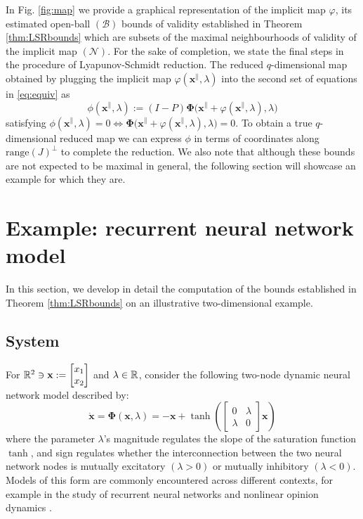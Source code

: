 \documentclass[letterpaper, 10 pt, conference, dvipsnames]{ieeeconf}
\begin{document}
In Fig. \ref{fig:map} we provide a graphical representation of the implicit map \(\varphi\), {its estimated open-ball \((\mathcal{B})\) bounds of validity established in Theorem \ref{thm:LSRbounds} which are subsets of the maximal neighbourhoods of validity of the implicit map \((\mathcal{N})\)}. For the sake of completion, we state the final steps in the procedure of {Lyapunov-Schmidt} reduction. The reduced \(q\)-dimensional map obtained by plugging the implicit map \(\varphi(\mathbf{x}^{\parallel},\lambda)\) into the second set of equations in \eqref{eq:equiv} as
\begin{equation*}
    \phi(\mathbf{x}^\parallel,\lambda) := (I-P)\boldsymbol{\Phi}\big(\mathbf{x}^\parallel+\varphi(\mathbf{x}^\parallel,\lambda),\lambda\big)
\end{equation*}
satisfying \(\phi(\mathbf{x}^\parallel,\lambda) = 0\iff\boldsymbol{\Phi}\big(\mathbf{x}^\parallel+\varphi(\mathbf{x}^\parallel,\lambda),\lambda\big) = 0\). To obtain a true \(q\)-dimensional reduced map we can express \(\phi\) in terms of coordinates along \(\mathrm{range}(J)^{\perp}\) to complete the reduction. {We also note that although these bounds are not expected to be maximal in general, the following section will showcase an example for which they are.}


\section{Example: recurrent neural network model \label{sec:example}}

In this section, we develop in detail the computation of the bounds established in Theorem \ref{thm:LSRbounds} on an illustrative two-dimensional example.

\subsection{System}
For \(\R[2]\ni\mathbf{x} := \begin{bmatrix}x_1\\x_2\end{bmatrix}\) and \(\lambda\in\R\), consider the following two-node dynamic neural network model described by:
\begin{equation}
    \dot{\mathbf{x}} = \boldsymbol{\Phi}(\mathbf{x},\lambda)
    = -\mathbf{x}+\tanh\left(\begin{bmatrix}0&\lambda\\\lambda&0\end{bmatrix}\mathbf{x}\right) \label{eq:example}
\end{equation}
where the parameter \(\lambda\)'s magnitude regulates the slope of the saturation function \(\tanh\), and sign regulates whether the interconnection between the two neural network nodes is mutually excitatory \((\lambda>0)\) or mutually inhibitory \((\lambda<0)\). {Models of this form are commonly encountered across different contexts, for example in the study of recurrent neural networks \cite{cheng2006multistability} and nonlinear opinion dynamics \cite{bizyaeva2022nonlinear}.}
\end{document}
